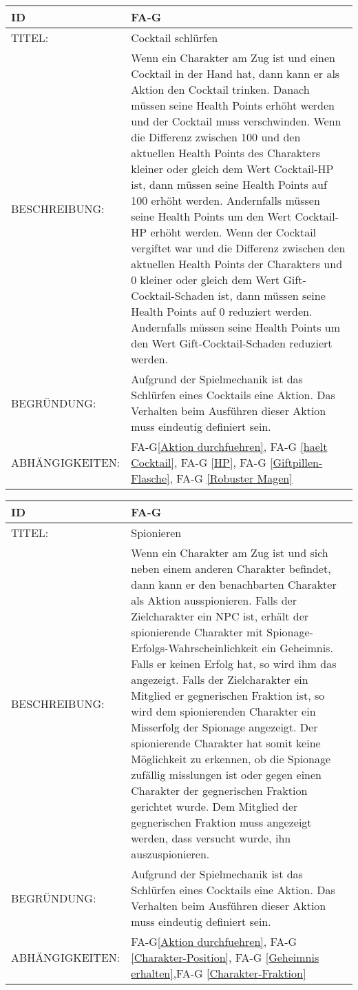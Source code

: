 \begin{tabularx}{16cm}{l|X}
	{table}\label{Cocktail schluerfen}
	\textbf{ID} & \textbf{FA-G\arabic{table}} \\
	\hline
	TITEL: & Cocktail schlürfen \\
	\hline
	BESCHREIBUNG: & Wenn ein Charakter am Zug ist und einen Cocktail in der Hand hat, dann kann er als Aktion den Cocktail trinken. Danach müssen seine Health Points erhöht werden und der Cocktail muss verschwinden. Wenn die Differenz zwischen 100 und den aktuellen Health Points des Charakters kleiner oder gleich dem Wert Cocktail-HP ist, dann müssen seine Health Points auf 100 erhöht werden. Andernfalls müssen seine Health Points um den Wert Cocktail-HP erhöht werden. Wenn der Cocktail vergiftet war und die Differenz zwischen den aktuellen Health Points der Charakters und 0 kleiner oder gleich dem Wert Gift-Cocktail-Schaden ist, dann müssen seine Health Points auf 0 reduziert werden. Andernfalls müssen seine Health Points um den Wert Gift-Cocktail-Schaden reduziert werden. \\
	\hline
	BEGRÜNDUNG: & Aufgrund der Spielmechanik ist das Schlürfen eines Cocktails eine Aktion. Das Verhalten beim Ausführen dieser Aktion muss eindeutig definiert sein.\\
	\hline
	ABHÄNGIGKEITEN: & FA-G\ref{Aktion durchfuehren}, FA-G \ref{haelt Cocktail}, FA-G \ref{HP}, FA-G \ref{Giftpillen-Flasche}, FA-G \ref{Robuster Magen} \\
\end{tabularx}


\begin{tabularx}{16cm}{l|X}
	{table}\label{Spionieren}
	\textbf{ID} & \textbf{FA-G\arabic{table}} \\
	\hline
	TITEL: & Spionieren \\
	\hline
	BESCHREIBUNG: & Wenn ein Charakter am Zug ist und sich neben einem anderen Charakter befindet, dann kann er den benachbarten Charakter als Aktion ausspionieren. Falls der Zielcharakter ein NPC ist, erhält der spionierende Charakter mit Spionage-Erfolgs-Wahrscheinlichkeit ein Geheimnis. Falls er keinen Erfolg hat, so wird ihm das angezeigt.
	Falls der Zielcharakter ein Mitglied er gegnerischen Fraktion ist, so wird dem spionierenden Charakter ein Misserfolg der Spionage angezeigt. Der spionierende Charakter hat somit keine Möglichkeit zu erkennen, ob die Spionage zufällig misslungen ist oder gegen einen Charakter der gegnerischen Fraktion gerichtet wurde. Dem Mitglied der gegnerischen Fraktion muss angezeigt werden, dass versucht wurde, ihn auszuspionieren.\\
	 
	\hline
	BEGRÜNDUNG: & Aufgrund der Spielmechanik ist das Schlürfen eines Cocktails eine Aktion. Das Verhalten beim Ausführen dieser Aktion muss eindeutig definiert sein.\\
	\hline
	ABHÄNGIGKEITEN: & FA-G\ref{Aktion durchfuehren}, FA-G \ref{Charakter-Position}, FA-G \ref{Geheimnis erhalten},FA-G \ref{Charakter-Fraktion} \\
\end{tabularx}

